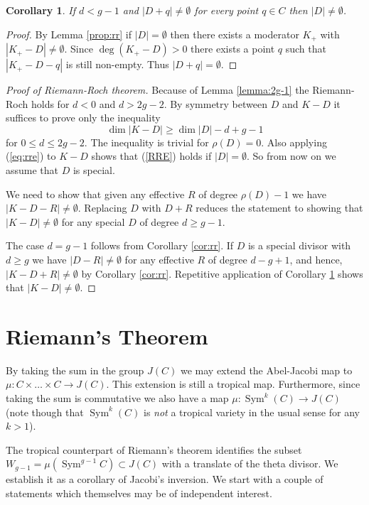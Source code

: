 \documentclass[12pt]{amsart}
\theoremstyle{plain}
\newtheorem{corollary}[theorem]{Corollary}
\theoremstyle{definition}
\theoremstyle{remark}
\newcommand{\<}{\langle}   %
\renewcommand{\>}{\rangle} %
\newcommand{\Sym}{\operatorname{Sym}}
\begin{document}
\begin{corollary}\label{div+1}
If $d<g-1$ and $|D+q|\neq\emptyset$ for every point $q\in C$
then $|D|\neq\emptyset$.
\end{corollary}
\begin{proof}
By Lemma \ref{prop:rr} if $|D|=\emptyset$ then there exists a moderator
$K_+$ with $|K_+-D|\ne\emptyset$. Since $\deg(K_+-D)>0$ there exists a point
$q$ such that $|K_+-D-q|$ is still non-empty. Thus $|D+q|=\emptyset$.
\end{proof}

\begin{proof}[Proof of Riemann-Roch theorem]
Because of Lemma \ref{lemma:2g-1} the Riemann-Roch holds for $d<0$ and $d> 2g-2$.
By symmetry between $D$ and  $K-D$ it suffices to prove only the inequality
\begin{equation}\label{RRE}
\dim|K-D| \geq \dim|D| - d+g-1
\end{equation}
for $0\leq d\leq 2g-2$. The inequality is trivial for $\rho(D)=0$.
Also applying (\ref{eq:rre}) to $K-D$ shows that (\ref{RRE}) holds if $|D|=\emptyset$.
So from now on we assume that $D$ is special.

We need to show that given any effective $R$ of degree $\rho(D)-1$ we have $|K-D-R|\neq\emptyset$.
Replacing $D$ with $D+R$ reduces the statement to showing that $|K-D|\neq\emptyset$ for any special
$D$ of degree $d\geq g-1$.

The case $d=g-1$ follows from Corollary \ref{cor:rr}.
If $D$ is a special divisor with $d\ge g$ we have $|D-R|\neq\emptyset$ for any effective $R$ of degree $d-g+1$,
and hence, $|K-D+R|\neq\emptyset$ by Corollary \ref{cor:rr}. Repetitive application of Corollary
\ref{div+1} shows that $|K-D|\neq\emptyset$.
\end{proof}





\section{Riemann's Theorem}
By taking the sum in the group $J(C)$ we may extend the Abel-Jacobi
map to $\mu:C\times\dots\times C\to J(C)$. This extension is still a tropical map.
Furthermore, since taking the sum is commutative
we also have a map $\mu:\Sym^k(C)\to J(C)$ (note though that $\Sym^k(C)$ is {\em not}
a tropical variety in the usual sense for any $k>1$).

The tropical counterpart of Riemann's theorem identifies
the subset $W_{g-1}=\mu(\Sym^{g-1}C)\subset J(C)$ with a translate of the theta divisor.
We establish it as a corollary of Jacobi's inversion.
We start with a couple of statements which themselves may be of independent interest.
\end{document}
